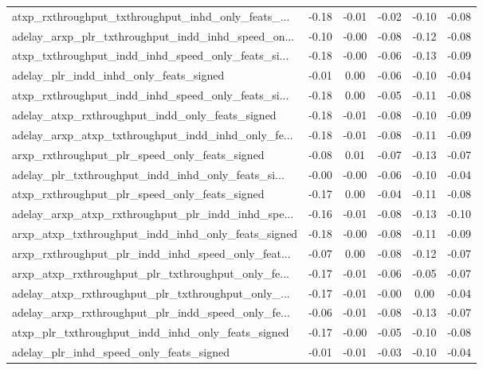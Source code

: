 \begin{tabular}{|l|*{4}{c}|r|}
atxp\_rxthroughput\_txthroughput\_inhd\_only\_feats\_... & -0.18 & -0.01 &   -0.02 &      -0.10 & -0.08 \\
adelay\_arxp\_plr\_txthroughput\_indd\_inhd\_speed\_on... & -0.10 & -0.00 &   -0.08 &      -0.12 & -0.08 \\
atxp\_txthroughput\_indd\_inhd\_speed\_only\_feats\_si... & -0.18 & -0.00 &   -0.06 &      -0.13 & -0.09 \\
adelay\_plr\_indd\_inhd\_only\_feats\_signed             & -0.01 &  0.00 &   -0.06 &      -0.10 & -0.04 \\
atxp\_rxthroughput\_indd\_inhd\_speed\_only\_feats\_si... & -0.18 &  0.00 &   -0.05 &      -0.11 & -0.08 \\
adelay\_atxp\_rxthroughput\_indd\_only\_feats\_signed    & -0.18 & -0.01 &   -0.08 &      -0.10 & -0.09 \\
adelay\_arxp\_atxp\_txthroughput\_indd\_inhd\_only\_fe... & -0.18 & -0.01 &   -0.08 &      -0.11 & -0.09 \\
arxp\_rxthroughput\_plr\_speed\_only\_feats\_signed      & -0.08 &  0.01 &   -0.07 &      -0.13 & -0.07 \\
adelay\_plr\_txthroughput\_indd\_inhd\_only\_feats\_si... & -0.00 & -0.00 &   -0.06 &      -0.10 & -0.04 \\
atxp\_rxthroughput\_plr\_speed\_only\_feats\_signed      & -0.17 &  0.00 &   -0.04 &      -0.11 & -0.08 \\
adelay\_arxp\_atxp\_rxthroughput\_plr\_indd\_inhd\_spe... & -0.16 & -0.01 &   -0.08 &      -0.13 & -0.10 \\
arxp\_atxp\_txthroughput\_indd\_inhd\_only\_feats\_signed & -0.18 & -0.00 &   -0.08 &      -0.11 & -0.09 \\
arxp\_rxthroughput\_plr\_indd\_inhd\_speed\_only\_feat... & -0.07 &  0.00 &   -0.08 &      -0.12 & -0.07 \\
arxp\_atxp\_rxthroughput\_plr\_txthroughput\_only\_fe... & -0.17 & -0.01 &   -0.06 &      -0.05 & -0.07 \\
adelay\_atxp\_rxthroughput\_plr\_txthroughput\_only\_... & -0.17 & -0.01 &   -0.00 &       0.00 & -0.04 \\
adelay\_arxp\_rxthroughput\_plr\_indd\_speed\_only\_fe... & -0.06 & -0.01 &   -0.08 &      -0.13 & -0.07 \\
atxp\_plr\_txthroughput\_indd\_inhd\_only\_feats\_signed  & -0.17 & -0.00 &   -0.05 &      -0.10 & -0.08 \\
adelay\_plr\_inhd\_speed\_only\_feats\_signed            & -0.01 & -0.01 &   -0.03 &      -0.10 & -0.04 \\

\end{tabular}

